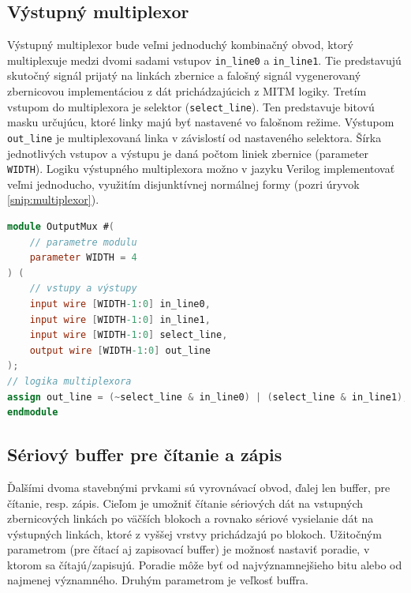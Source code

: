 \subsection{Výstupný multiplexor}\label{subsek:multiplexor}
Výstupný multiplexor bude veľmi jednoduchý kombinačný obvod, ktorý multiplexuje medzi dvomi sadami vstupov \texttt{in\_line0} a \texttt{in\_line1}. Tie predstavujú skutočný signál prijatý na linkách zbernice a falošný signál vygenerovaný zbernicovou implementáciou z dát prichádzajúcich z MITM logiky. Tretím vstupom do multiplexora je selektor (\texttt{select\_line}). Ten predstavuje bitovú masku určujúcu, ktoré linky majú byť nastavené vo falošnom režime. Výstupom \texttt{out\_line} je multiplexovaná linka v závislostí od nastaveného selektora. Šírka jednotlivých vstupov a výstupu je daná počtom liniek zbernice (parameter \texttt{WIDTH}). Logiku výstupného multiplexora možno v jazyku Verilog implementovať veľmi jednoducho, využitím disjunktívnej normálnej formy (pozri úryvok \ref{snip:multiplexor}).

\begin{lstlisting}[float,language=Verilog,caption={Logika výstupného multiplexora v jazyku Verilog. Sémantika operátorov \& a | pre viacbitové signály zabezpečí paralelné spracovanie všetkých liniek.},label=snip:multiplexor]
module OutputMux #(
	// parametre modulu
	parameter WIDTH = 4
) (
    // vstupy a výstupy
    input wire [WIDTH-1:0] in_line0,
    input wire [WIDTH-1:0] in_line1,
    input wire [WIDTH-1:0] select_line,
    output wire [WIDTH-1:0] out_line
);
// logika multiplexora
assign out_line = (~select_line & in_line0) | (select_line & in_line1);
endmodule
\end{lstlisting}

\subsection{Sériový buffer pre čítanie a zápis}
Ďalšími dvoma stavebnými prvkami sú vyrovnávací obvod, ďalej len buffer, pre čítanie, resp. zápis. Cieľom je umožniť čítanie sériových dát na vstupných zbernicových linkách po väčších blokoch a rovnako sériové vysielanie dát na výstupných linkách, ktoré z vyššej vrstvy prichádzajú po blokoch. Užitočným parametrom (pre čítací aj zapisovací buffer) je možnosť nastaviť poradie, v ktorom sa čítajú/zapisujú. Poradie môže byť od najvýznamnejšieho bitu alebo od najmenej významného. Druhým parametrom je veľkosť buffra.

